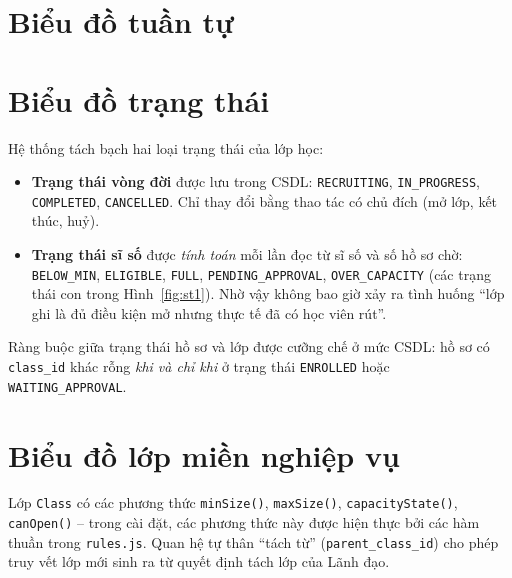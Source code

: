 \section{Biểu đồ tuần tự}

\section{Biểu đồ trạng thái}
Hệ thống tách bạch hai loại trạng thái của lớp học:
\begin{itemize}
  \item \textbf{Trạng thái vòng đời} được lưu trong CSDL: \texttt{RECRUITING}, \texttt{IN\_PROGRESS}, \texttt{COMPLETED}, \texttt{CANCELLED}. Chỉ thay đổi bằng thao tác có chủ đích (mở lớp, kết thúc, huỷ).
  \item \textbf{Trạng thái sĩ số} được \emph{tính toán} mỗi lần đọc từ sĩ số và số hồ sơ chờ: \texttt{BELOW\_MIN}, \texttt{ELIGIBLE}, \texttt{FULL}, \texttt{PENDING\_APPROVAL}, \texttt{OVER\_CAPACITY} (các trạng thái con trong Hình~\ref{fig:st1}). Nhờ vậy không bao giờ xảy ra tình huống “lớp ghi là đủ điều kiện mở nhưng thực tế đã có học viên rút”.
\end{itemize}
Ràng buộc giữa trạng thái hồ sơ và lớp được cưỡng chế ở mức CSDL: hồ sơ có \texttt{class\_id} khác rỗng \emph{khi và chỉ khi} ở trạng thái \texttt{ENROLLED} hoặc \texttt{WAITING\_APPROVAL}.

\section{Biểu đồ lớp miền nghiệp vụ}
Lớp \texttt{Class} có các phương thức \texttt{minSize()}, \texttt{maxSize()}, \texttt{capacityState()}, \texttt{canOpen()} – trong cài đặt, các phương thức này được hiện thực bởi các hàm thuần trong \texttt{rules.js}. Quan hệ tự thân “tách từ” (\texttt{parent\_class\_id}) cho phép truy vết lớp mới sinh ra từ quyết định tách lớp của Lãnh đạo.

